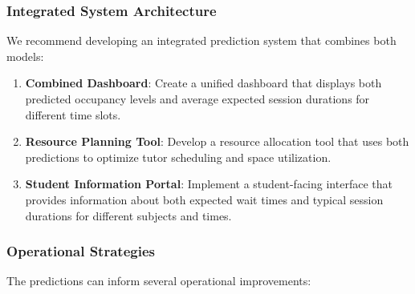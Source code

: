\documentclass[12pt,letterpaper]{article}
\begin{document}
\subsubsection{Integrated System Architecture}

We recommend developing an integrated prediction system that combines both models:

\begin{enumerate}
    \item \textbf{Combined Dashboard}: Create a unified dashboard that displays both predicted occupancy levels and average expected session durations for different time slots.

    \item \textbf{Resource Planning Tool}: Develop a resource allocation tool that uses both predictions to optimize tutor scheduling and space utilization.

    \item \textbf{Student Information Portal}: Implement a student-facing interface that provides information about both expected wait times and typical session durations for different subjects and times.
\end{enumerate}

\subsubsection{Operational Strategies}

The predictions can inform several operational improvements:
\end{document}
